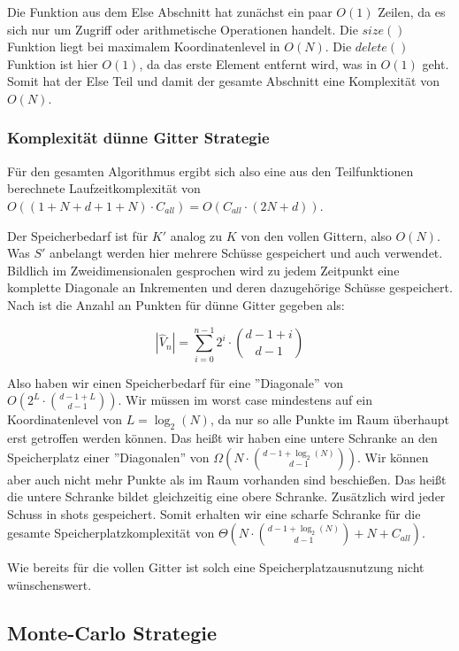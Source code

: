\documentclass[a4paper,12pt]{llncs}
\numberwithin{equation}{section}
\begin{document}
Die Funktion aus dem Else Abschnitt hat zunächst ein paar $O(1)$ Zeilen, da es sich nur um Zugriff oder arithmetische Operationen handelt. Die $size()$ Funktion liegt bei maximalem Koordinatenlevel in $O(N)$. Die $delete()$ Funktion ist hier $O(1)$, da das erste Element entfernt wird, was in $O(1)$ geht. Somit hat der Else Teil und damit der gesamte Abschnitt eine Komplexität von $O(N)$.

\subsubsection{Komplexität dünne Gitter Strategie}

Für den gesamten Algorithmus ergibt sich also eine aus den Teilfunktionen berechnete Laufzeitkomplexität von $O((1+N+d+1+N)\cdot C_{all}) = O(C_{all}\cdot(2N+d))$.

Der Speicherbedarf ist für $K'$ analog zu $K$ von den vollen Gittern, also $O(N)$. Was $S'$ anbelangt werden hier mehrere Schüsse gespeichert und auch verwendet. Bildlich im Zweidimensionalen gesprochen wird zu jedem Zeitpunkt eine komplette Diagonale an Inkrementen und deren dazugehörige Schüsse gespeichert. Nach \cite{GG08} ist die Anzahl an Punkten für dünne Gitter gegeben als:

\begin{equation}
\left|\hat{V}_n\right| = \sum_{i=0}^{n-1} 2^i \cdot \binom{d-1+i}{d-1}
\end{equation}

Also haben wir einen Speicherbedarf für eine ''Diagonale'' von $O\left(2^L \cdot \binom{d-1+L}{d-1}\right)$. Wir müssen im worst case mindestens auf ein Koordinatenlevel von $L=\log_2(N)$, da nur so alle Punkte im Raum überhaupt erst getroffen werden können. Das heißt wir haben eine untere Schranke an den Speicherplatz einer ''Diagonalen'' von $\Omega\left(N \cdot \binom{d-1+\log_2(N)}{d-1}\right)$. Wir können aber auch nicht mehr Punkte als im Raum vorhanden sind beschießen. Das heißt die untere Schranke bildet gleichzeitig eine obere Schranke. Zusätzlich wird jeder Schuss in shots gespeichert. Somit erhalten wir eine scharfe Schranke für die gesamte Speicherplatzkomplexität von $\Theta\left(N \cdot \binom{d-1+\log_2(N)}{d-1} + N + C_{all}\right)$.

Wie bereits für die vollen Gitter ist solch eine Speicherplatzausnutzung nicht wünschenswert.


\subsection{Monte-Carlo Strategie}
\end{document}
